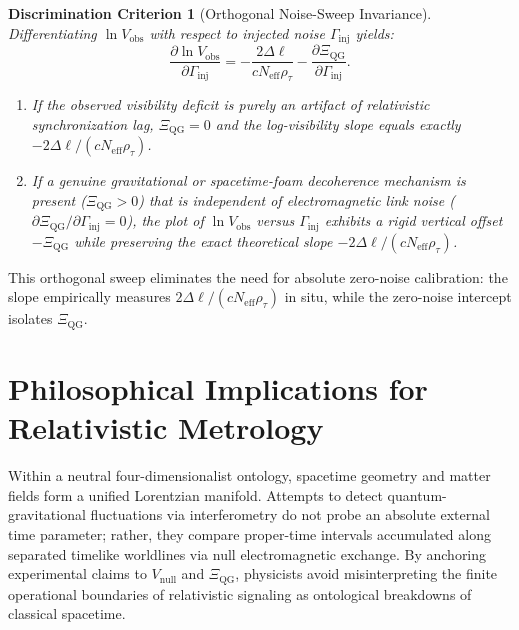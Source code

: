 \documentclass[11pt,a4paper]{article}
\newtheorem{criterion}{Discrimination Criterion}
\begin{document}
\begin{criterion}[Orthogonal Noise-Sweep Invariance]
Differentiating $\ln V_{\mathrm{obs}}$ with respect to injected noise $\Gamma_{\mathrm{inj}}$ yields:
\begin{equation}
\frac{\partial \ln V_{\mathrm{obs}}}{\partial \Gamma_{\mathrm{inj}}} = -\frac{2\Delta\ell}{c N_{\mathrm{eff}}\rho_{\tau}} - \frac{\partial \Xi_{\mathrm{QG}}}{\partial \Gamma_{\mathrm{inj}}}.
\end{equation}
\begin{enumerate}
    \item If the observed visibility deficit is purely an artifact of relativistic synchronization lag, $\Xi_{\mathrm{QG}} = 0$ and the log-visibility slope equals exactly $-2\Delta\ell / (c N_{\mathrm{eff}}\rho_{\tau})$.
    \item If a genuine gravitational or spacetime-foam decoherence mechanism is present ($\Xi_{\mathrm{QG}} > 0$) that is independent of electromagnetic link noise ($\partial \Xi_{\mathrm{QG}} / \partial \Gamma_{\mathrm{inj}} = 0$), the plot of $\ln V_{\mathrm{obs}}$ versus $\Gamma_{\mathrm{inj}}$ exhibits a rigid vertical offset $-\Xi_{\mathrm{QG}}$ while preserving the exact theoretical slope $-2\Delta\ell / (c N_{\mathrm{eff}}\rho_{\tau})$.
\end{enumerate}
\end{criterion}

This orthogonal sweep eliminates the need for absolute zero-noise calibration: the slope empirically measures $2\Delta\ell / (c N_{\mathrm{eff}}\rho_{\tau})$ in situ, while the zero-noise intercept isolates $\Xi_{\mathrm{QG}}$.

\section{Philosophical Implications for Relativistic Metrology}

Within a neutral four-dimensionalist ontology, spacetime geometry and matter fields form a unified Lorentzian manifold. Attempts to detect quantum-gravitational fluctuations via interferometry do not probe an absolute external time parameter; rather, they compare proper-time intervals accumulated along separated timelike worldlines via null electromagnetic exchange. By anchoring experimental claims to $V_{\mathrm{null}}$ and $\Xi_{\mathrm{QG}}$, physicists avoid misinterpreting the finite operational boundaries of relativistic signaling as ontological breakdowns of classical spacetime.
\end{document}
